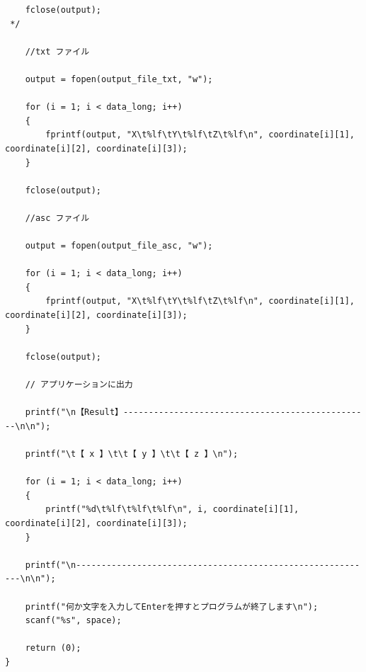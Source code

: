 \documentclass[12pt,a4paper]{jsarticle}
\begin{document}
\begin{lstlisting}
    fclose(output);
 */

    //txt ファイル

    output = fopen(output_file_txt, "w");

    for (i = 1; i < data_long; i++)
    {
        fprintf(output, "X\t%lf\tY\t%lf\tZ\t%lf\n", coordinate[i][1], coordinate[i][2], coordinate[i][3]);
    }

    fclose(output);

    //asc ファイル

    output = fopen(output_file_asc, "w");

    for (i = 1; i < data_long; i++)
    {
        fprintf(output, "X\t%lf\tY\t%lf\tZ\t%lf\n", coordinate[i][1], coordinate[i][2], coordinate[i][3]);
    }

    fclose(output);

    // アプリケーションに出力

    printf("\n【Result】-------------------------------------------------\n\n");

    printf("\t【 x 】\t\t【 y 】\t\t【 z 】\n");

    for (i = 1; i < data_long; i++)
    {
        printf("%d\t%lf\t%lf\t%lf\n", i, coordinate[i][1], coordinate[i][2], coordinate[i][3]);
    }

    printf("\n-----------------------------------------------------------\n\n");

    printf("何か文字を入力してEnterを押すとプログラムが終了します\n");
    scanf("%s", space);

    return (0);
}
\end{lstlisting}
\end{document}
